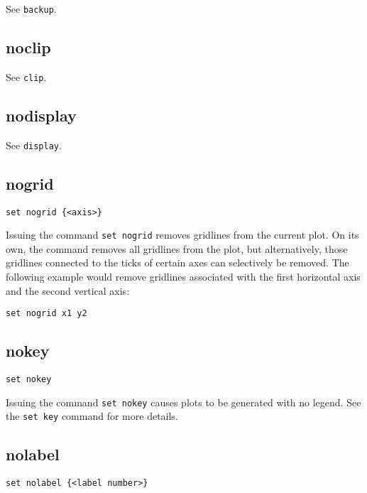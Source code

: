 See {\tt backup}.


\subsection{noclip}

See {\tt clip}.


\subsection{nodisplay}

See {\tt display}.


\subsection{nogrid}

\begin{verbatim}
set nogrid {<axis>}
\end{verbatim}

Issuing the command {\tt set nogrid} removes gridlines from the current plot. On
its own, the command removes all gridlines from the plot, but alternatively,
those gridlines connected to the ticks of certain axes can selectively be
removed.  The following example would remove gridlines associated with the
first horizontal axis and the second vertical axis:

\begin{verbatim}
set nogrid x1 y2
\end{verbatim}


\subsection{nokey}

\begin{verbatim}
set nokey
\end{verbatim}

Issuing the command {\tt set nokey} causes plots to be generated with no legend.
See the {\tt set key} command for more details.


\subsection{nolabel}

\begin{verbatim}
set nolabel {<label number>}
\end{verbatim}

